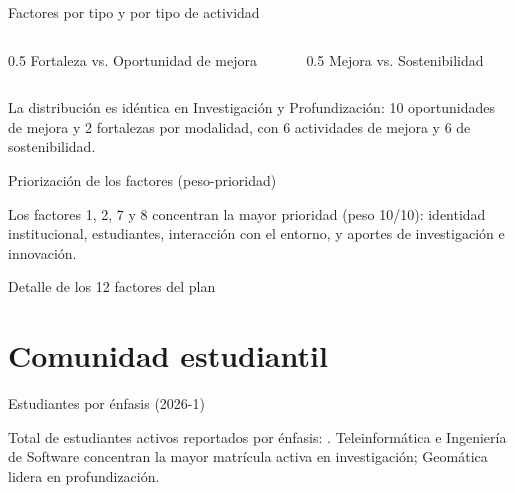 \documentclass[aspectratio=169, 11pt]{beamer}
\begin{document}
\begin{frame}{Factores por tipo y por tipo de actividad}
  \begin{columns}[T]
    \begin{column}{0.5\textwidth}
      \centering \footnotesize Fortaleza vs. Oportunidad de mejora
      \resizebox{\linewidth}{!}{\ChartFactoresTipo}
    \end{column}
    \begin{column}{0.5\textwidth}
      \centering \footnotesize Mejora vs. Sostenibilidad
      \resizebox{\linewidth}{!}{\ChartFactoresActividad}
    \end{column}
  \end{columns}
  \vspace{0.3cm}
  \small La distribución es idéntica en Investigación y Profundización: 10 oportunidades de mejora y 2 fortalezas por modalidad, con 6 actividades de mejora y 6 de sostenibilidad.
\end{frame}

\begin{frame}{Priorización de los factores (peso-prioridad)}
  \centering
  \resizebox{0.85\linewidth}{!}{\ChartPesoFactores}
  \par
  \vspace{0.2cm}
  \small Los factores 1, 2, 7 y 8 concentran la mayor prioridad (peso 10/10): identidad institucional, estudiantes, interacción con el entorno, y aportes de investigación e innovación.
\end{frame}

\begin{frame}{Detalle de los 12 factores del plan}
  \tiny
  \TablaFactores
\end{frame}

\section{Comunidad estudiantil}

\begin{frame}{Estudiantes por énfasis (2026-1)}
  \centering
  \resizebox{0.92\linewidth}{!}{\ChartEnfasis}
  \par
  \vspace{0.2cm}
  \small Total de estudiantes activos reportados por énfasis: \textbf{\EnfasisTotalGeneral}. Teleinformática e Ingeniería de Software concentran la mayor matrícula activa en investigación; Geomática lidera en profundización.
\end{frame}
\end{document}
